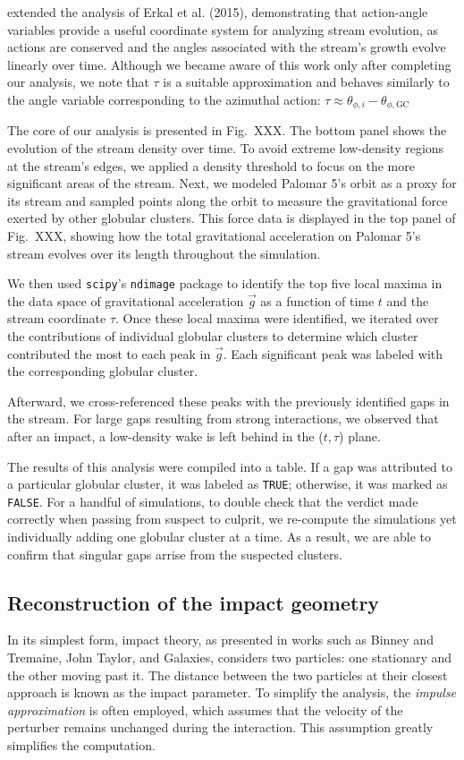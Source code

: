 \documentclass[]{aa}
\begin{document}
      \citet{sanders2016dynamics} extended the analysis of Erkal et al. (2015), demonstrating that action-angle variables provide a useful coordinate system for analyzing stream evolution, as actions are conserved and the angles associated with the stream's growth evolve linearly over time. Although we became aware of this work only after completing our analysis, we note that $\tau$ is a suitable approximation and behaves similarly to the angle variable corresponding to the azimuthal action: $\tau \approx \theta_{\phi,i} - \theta_{\phi,\text{GC}}$

      The core of our analysis is presented in Fig.~XXX. The bottom panel shows the evolution of the stream density over time. To avoid extreme low-density regions at the stream's edges, we applied a density threshold to focus on the more significant areas of the stream. Next, we modeled Palomar 5's orbit as a proxy for its stream and sampled points along the orbit to measure the gravitational force exerted by other globular clusters. This force data is displayed in the top panel of Fig.~XXX, showing how the total gravitational acceleration on Palomar 5's stream evolves over its length throughout the simulation.

      We then used \texttt{scipy}'s \texttt{ndimage} package to identify the top five local maxima in the data space of gravitational acceleration $\vec{g}$ as a function of time $t$ and the stream coordinate $\tau$. Once these local maxima were identified, we iterated over the contributions of individual globular clusters to determine which cluster contributed the most to each peak in $\vec{g}$. Each significant peak was labeled with the corresponding globular cluster.


      Afterward, we cross-referenced these peaks with the previously identified gaps in the stream. For large gaps resulting from strong interactions, we observed that after an impact, a low-density wake is left behind in the ($t,\tau$) plane.

      The results of this analysis were compiled into a table. If a gap was attributed to a particular globular cluster, it was labeled as \texttt{TRUE}; otherwise, it was marked as \texttt{FALSE}. For a handful of simulations, to double check that the verdict made correctly when passing from suspect to culprit, we re-compute the simulations yet individually adding one globular cluster at a time. As a result, we are able to confirm that singular gaps arrise from the suspected clusters.  


  \subsection{Reconstruction of the impact geometry}
    In its simplest form, impact theory, as presented in works such as Binney and Tremaine, John Taylor, and Galaxies, considers two particles: one stationary and the other moving past it. The distance between the two particles at their closest approach is known as the impact parameter. To simplify the analysis, the \textit{impulse approximation} is often employed, which assumes that the velocity of the perturber remains unchanged during the interaction. This assumption greatly simplifies the computation.
\end{document}
